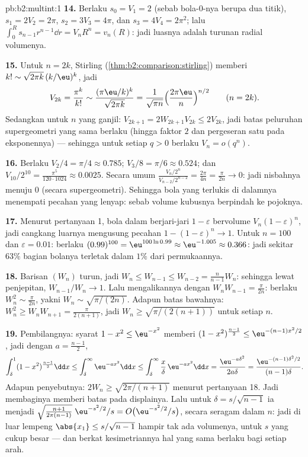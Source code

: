 \begin{solution}{pb:b2:multint:1}
\textbf{14.} Berlaku $s_0 = V_1 = 2$ (sebab bola-$0$-nya berupa dua titik),
$s_1 = 2V_2 = 2\pi$, $s_2 = 3V_3 = 4\pi$, dan $s_3 = 4V_4 =
2\pi^2$; lalu $\int_0^R s_{n-1}r^{n-1}\dd r = V_nR^n =
v_n(R)$: jadi luasnya adalah turunan radial volumenya.

\textbf{15.} Untuk $n = 2k$, Stirling
(\cref{thm:b2:comparison:stirling}) memberi $k! \sim
\sqrt{2\pi k}\,(k/\eu)^k$, jadi
\[
V_{2k} = \frac{\pi^k}{k!}
\sim \frac{(\pi\eu/k)^k}{\sqrt{2\pi k}}
= \frac1{\sqrt{\pi n}}\Bigl(\frac{2\pi\eu}n\Bigr)^{n/2}
\qquad (n = 2k).
\]
Sedangkan untuk $n$ yang ganjil: $V_{2k+1} = 2W_{2k+1}V_{2k} \leq 2V_{2k}$, jadi
batas peluruhan supergeometri yang sama berlaku (hingga faktor
$2$ dan pergeseran satu pada eksponennya) --- sehingga untuk setiap $q >
0$ berlaku $V_n = o(q^n)$.

\textbf{16.} Berlaku $V_2/4 = \pi/4 \approx 0.785$; $V_3/8 = \pi/6
\approx 0.524$; dan $V_{10}/2^{10} = \frac{\pi^5}{120\cdot1024}
\approx 0.0025$. Secara umum $\frac{V_n/2^n}{V_{n-2}/2^{n-2}}
= \frac{2\pi}{4n} = \frac{\pi}{2n} \to 0$: jadi nisbahnya menuju
$0$ (secara supergeometri). Sehingga bola yang terlukis di dalamnya menempati
pecahan yang lenyap: sebab volume kubusnya berpindah ke
pojoknya.

\textbf{17.} Menurut pertanyaan 1, bola dalam berjari-jari $1 -
\varepsilon$ bervolume $V_n(1-\varepsilon)^n$, jadi cangkang
luarnya mengusung pecahan $1 - (1 - \varepsilon)^n \to 1$.
Untuk $n = 100$ dan $\varepsilon = 0.01$: berlaku $(0.99)^{100} =
\eu^{100\ln0.99} \approx \eu^{-1.005} \approx 0.366$: jadi sekitar
$63\%$ bagian bolanya terletak dalam $1\%$ dari permukaannya.

\textbf{18.} Barisan $(W_n)$ turun, jadi $W_n \leq W_{n-1} \leq
W_{n-2} = \frac{n}{n-1}W_n$: sehingga lewat penjepitan, $W_{n-1}/W_n \to 1$.
Lalu mengalikannya dengan $W_nW_{n-1} = \frac\pi{2n}$: berlaku $W_n^2 \sim
\frac\pi{2n}$, yakni $W_n \sim \sqrt{\pi/(2n)}$. Adapun batas bawahnya:
$W_n^2 \geq W_nW_{n+1} = \frac{\pi}{2(n+1)}$, jadi $W_n \geq
\sqrt{\pi/(2(n+1))}$ untuk setiap $n$.

\textbf{19.} Pembilangnya: syarat $1 - x^2 \leq \eu^{-x^2}$ memberi $(1 -
x^2)^{\frac{n-1}2} \leq \eu^{-(n-1)x^2/2}$, jadi dengan $a =
\frac{n-1}2$,
\[
\int_\delta^1(1 - x^2)^{\frac{n-1}2}\dd x
\leq \int_\delta^\infty\eu^{-ax^2}\dd x
\leq \int_\delta^\infty\frac x\delta\,\eu^{-ax^2}\dd x
= \frac{\eu^{-a\delta^2}}{2a\delta}
= \frac{\eu^{-(n-1)\delta^2/2}}{(n-1)\delta}.
\]
Adapun penyebutnya: $2W_n \geq \sqrt{2\pi/(n+1)}$ menurut pertanyaan 18.
Jadi membaginya memberi batas pada displainya. Lalu untuk $\delta =
s/\sqrt{n-1}$ ia menjadi
$\sqrt{\tfrac{n+1}{2\pi(n-1)}}\;\eu^{-s^2/2}/s = O\bigl(
\eu^{-s^2/2}/s\bigr)$, secara seragam dalam $n$: jadi di luar lempeng
$\abs{x_1} \leq s/\sqrt{n-1}$ hampir tak ada volumenya, untuk
$s$ yang cukup besar --- dan berkat kesimetriannya hal yang sama berlaku bagi
setiap arah.


\end{solution}
